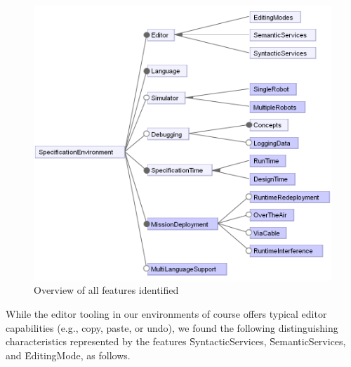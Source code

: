\begin{figure}[t]
     \centering
    \includegraphics[width=\columnwidth]{fig/toplevelfeatures.png}
			\vspace{-.3cm}
      \caption{Overview of all features identified%
      }
      \label{fig:featuremodel}
			\vspace{-.4cm}
\end{figure}

\newcommand{\fsyntacticservices}{\f{SyntacticServices}}
\newcommand{\fsemanticservices}{\f{SemanticServices}}
\newcommand{\feditingmode}{\f{EditingMode}}

 While the editor tooling in our environments of course offers typical editor capabilities (e.g., copy, paste, or undo), we found the following distinguishing characteristics represented by the features \fsyntacticservices, \fsemanticservices, and \feditingmode, as follows.

